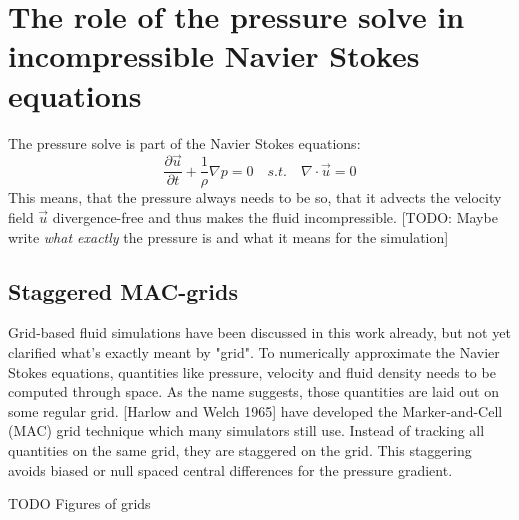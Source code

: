 \section{The role of the pressure solve in incompressible Navier Stokes equations}
The pressure solve is part of the Navier Stokes equations:
\begin{equation} \label{navier-stokes-pressure}
    \frac{\partial \vec{u}}{\partial t} + \frac{1}{\rho}  \nabla p = 0 \quad s.t. \quad \nabla \cdot \vec{u} = 0
\end{equation}
This means, that the pressure always needs to be so, that it advects the velocity field $\vec{u}$ divergence-free and thus makes the fluid incompressible.  [TODO: Maybe write \textit{what exactly} the pressure is and what it means for the simulation]

\subsection{Staggered MAC-grids}
Grid-based fluid simulations have been discussed in this work already, but not yet clarified what's exactly meant by "grid". To numerically approximate the Navier Stokes equations, quantities like pressure, velocity and fluid density needs to be computed through space. As the name suggests, those quantities are laid out on some regular grid. [Harlow and Welch 1965] have developed the Marker-and-Cell (MAC) grid technique which many simulators still use. Instead of tracking all quantities on the same grid, they are staggered on the grid. This staggering avoids biased or null spaced central differences for the pressure gradient. 
\par TODO Figures of grids 

